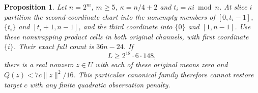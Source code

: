 \documentclass[11pt,a4paper]{article}
\newtheorem{proposition}[theorem]{Proposition}
\newcommand{\norm}[1]{\lVert#1\rVert}
\begin{document}
\begin{proposition}\label{prop:chartrefinement}
Let $n=2^m$, $m\geq5$, $\kappa=n/4+2$ and $t_i=\kappa i\bmod n$.
At slice $i$ partition the second-coordinate chart into the nonempty members
of $[0,t_i-1]$, $\{t_i\}$ and $[t_i+1,n-1]$, and the third coordinate
into $\{0\}$ and $[1,n-1]$. Use these nonwrapping product cells in both
original channels, with first coordinate $\{i\}$. Their exact full count is
$36n-24$. If
\begin{equation}\label{eq:chartthreshold}
 L\geq2^{18}\cdot6\cdot148,
\end{equation}
there is a real nonzero $z\in U$ with each of these original means zero and
$Q(z)<7c\norm z^2/16$. This particular canonical family therefore cannot
restore target $c$ with any finite quadratic observation penalty.
\end{proposition}
\end{document}
